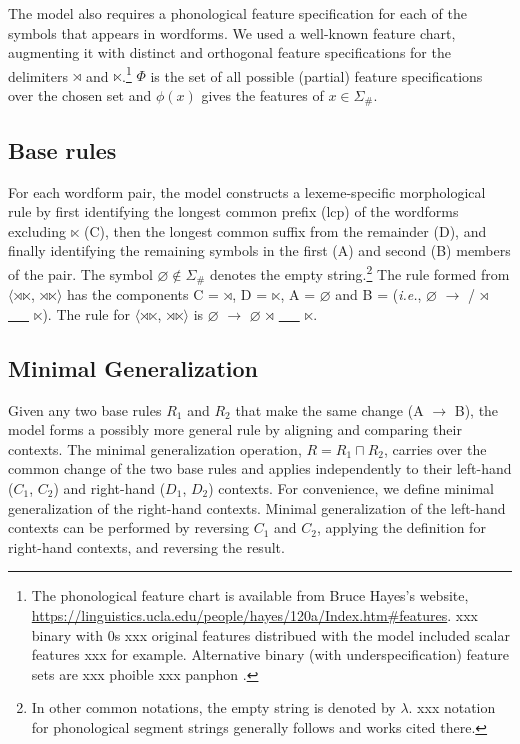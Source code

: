 \documentclass[11pt]{article}
\begin{document}
The model also requires a phonological feature specification for each of the symbols that appears in wordforms. We used a well-known feature chart, augmenting it with distinct and orthogonal feature specifications for the delimiters $\rtimes$ and $\ltimes$.\footnote{The phonological feature chart is available from Bruce Hayes's website, \url{https://linguistics.ucla.edu/people/hayes/120a/Index.htm\#features}. xxx binary with 0s xxx original features distribued with the model included scalar features xxx for example. Alternative binary (with underspecification) feature sets are xxx phoible \citep{moran2014} xxx panphon \citep{mortensen-etal-2016-panphon}.} $\Phi$ is the set of all possible (partial) feature specifications over the chosen set and $\phi(x)$ gives the features of $x \in \Sigma_{\#}$.

\subsection{Base rules}

For each wordform pair, the model constructs a lexeme-specific morphological rule by first identifying the longest common prefix (lcp) of the wordforms excluding $\ltimes$ (C), then the longest common suffix from the remainder (D), and finally identifying the remaining symbols in the first (A) and second (B) members of the pair. The symbol $\varnothing \notin \Sigma_{\#}$ denotes the empty string.\footnote{In other common notations, the empty string is denoted by $\lambda$. xxx notation for phonological segment strings generally follows \citep{chandlee2017a} and works cited there.} The rule formed from $\langle$$\rtimes$$\ltimes$, $\rtimes$$\ltimes$$\rangle$ has the components C = $\rtimes$, D = $\ltimes$, A = $\varnothing$ and B =  (\emph{i.e.}, $\varnothing$ $\to$  / $\rtimes$ \underline{\ \ \ } $\ltimes$). The rule for $\langle$$\rtimes$$\ltimes$, $\rtimes$$\ltimes$$\rangle$ is $\varnothing$ $\to$ $\varnothing$ $\rtimes$ \underline{\ \ \ } $\ltimes$.

\subsection{Minimal Generalization}
\label{sec:mingenop}
Given any two base rules $R_1$ and $R_2$ that make the same change (A $\to$ B), the model forms a possibly more general rule by aligning and comparing their contexts. The minimal generalization operation, $R = R_1 \sqcap R_2$, carries over the common change of the two base rules and applies independently to their left-hand ($C_1$, $C_2$) and right-hand ($D_1$, $D_2$) contexts. For convenience, we define minimal generalization of the right-hand contexts. Minimal generalization of the left-hand contexts can be performed by reversing $C_1$ and $C_2$, applying the definition for right-hand contexts, and reversing the result.
\end{document}
